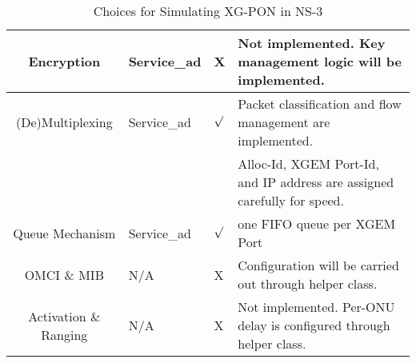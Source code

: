 \begin{table}[!htbp]
\begin{center}
\begin{tabular}{|c||l|l|l|}
Encryption & Service\_ad & {\color{red} X} & Not implemented. Key management logic will be implemented. \\
\hline

(De)Multiplexing & Service\_ad & {\color{blue} $\surd$} & Packet classification and flow management are implemented. \\
                 &             &                        & Alloc-Id, XGEM Port-Id, and IP address are assigned carefully for speed. \\
\hline

Queue Mechanism & Service\_ad & {\color{blue} $\surd$} & one FIFO queue per XGEM Port \\
\hline

OMCI \& MIB & N/A & {\color{red} X} & Configuration will be carried out through helper class. \\
\hline

Activation \& Ranging & N/A & {\color{red} X} & Not implemented. Per-ONU delay is configured through helper class.\\
\hline

\hline


\end{tabular}
\end{center}
\vspace{-0.1in}
\caption{Choices for Simulating XG-PON in NS-3} \label{table_choices4xgpon}
\end{table}

\clearpage
